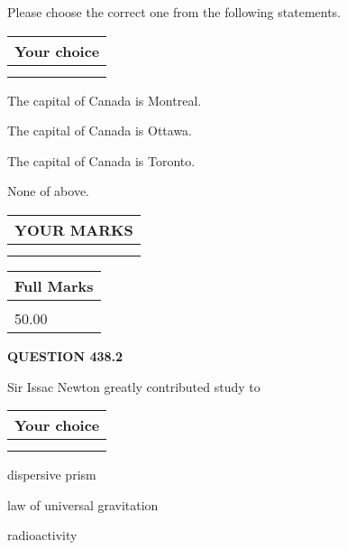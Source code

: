 \documentclass[12pt]{article}
\begin{document}
  
Please choose the correct one from the following statements.
  
  
\noindent\hspace{3.0in} \begin{tabular}{|l|}
\hline
Your choice \\
\hline
 \\ 
 \\ 
\hline
\end{tabular}
  
  
 
 
The capital of Canada is Montreal.
 
 
The capital of Canada is Ottawa.
 
 
The capital of Canada is Toronto.
 
 
 None of above.
 
 
  
\vspace{0.2in}
  
\noindent\begin{tabular}{|l|}
\hline
 YOUR MARKS  \\
\hline
 \\ 
 \\ 
\hline
\end{tabular}
\hspace{0.05in} \begin{tabular}{|l|}
\hline
 Full Marks  \\
\hline
 \\ 
50.00 \\
\hline
\end{tabular}
{\textbf{\Large{QUESTION
438.2 
}}}
  
  
Sir Issac Newton greatly contributed study to
  
  
\noindent\hspace{3.0in} \begin{tabular}{|l|}
\hline
Your choice \\
\hline
 \\ 
 \\ 
\hline
\end{tabular}
  
  
 
 
dispersive prism
 
 
law of universal gravitation
 
 
radioactivity
 
\end{document}
